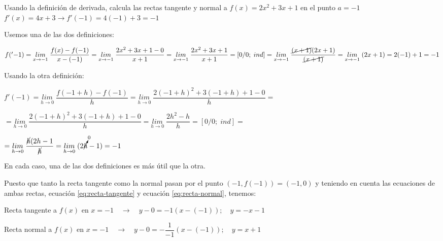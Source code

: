 	\begin{ejem} Usando la definición de derivada, calcula las rectas tangente y normal a $f(x)=2x^2+3x+1$ en el punto $a=-1 \qquad $\scriptsize{\textcolor{gris}{$f'(x)=4x+3 \to f'(-1)=4(-1)+3=-1$}}
	
	\normalsize
	Usemos una de las dos definiciones:
	
	$f('-1)=\underset {x\to -1}{lim}\;{\dfrac {f(x)-f(-1)}{x-(-1)}}= \underset {x\to -1}{lim}\;{\dfrac {2x^2+3x+1-0}{x+1}}=\underset {x\to -1}{lim}\;{\dfrac {2x^2+3x+1}{x+1}}=[0/0; \; ind]= \underset {x\to -1}{lim}\;{\dfrac {\cancel{(x+1)}(2x+1)}{\cancel{(x+1)}}}=\underset {x\to -1}{lim}\;{(2x+1)=2(-1)+1=-1}$
	
	Usando la otra definición:
	
	$f'(-1)=\underset {h\to 0}{lim}\; {\dfrac {f(-1+h)-f(-1)} {h}}= \underset {h\to 0}{lim}\; {\dfrac {2(-1+h)^2+3(-1+h)+1-0} {h}}=$
	
	$=\underset {h\to 0}{lim}\; {\dfrac {2(-1+h)^2+3(-1+h)+1-0} {h}}= \underset {h\to 0}{lim}\; {\dfrac {2h^2-h} {h}}=[0/0;\; ind]=$
	
	$ = \underset {h\to 0}{lim}\; {\dfrac {\cancel{h}(2h-1} {\cancel{h}}}=\underset {h\to 0}{lim}\; {(2 \cancelto{0}{h} - 1)}=-1$
	
	En cada caso, una de las dos definiciones es más útil que la otra.
	
	Puesto que tanto la recta tangente como la normal pasan por el punto $(-1,f(-1))=(-1,0)$ y teniendo en cuenta las ecuaciones de ambas rectas, ecuación \ref{eq:recta-tangente} y ecuación \ref{eq:recta-normal}, tenemos:
	
	Recta tangente a $f(x)$ en $x=-1 \quad \to \quad y-0=-1(x-(-1)); \quad y=-x-1$
	
	Recta normal a $f(x)$ en $x=-1 \quad \to \quad y-0=-\dfrac {1}{-1}(x-(-1)); \quad y=x+1$
	
	\end{ejem}
	
